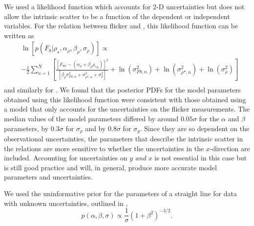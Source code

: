 We used a likelihood function which accounts for 2-D uncertainties but does
not allow the intrinsic scatter to be a function of the dependent or
independent variables.
For the relation between flicker and \rhostar, this likelihood function can be
written as
\begin{eqnarray}
	& \ln\left[p(F_8|\rho_\star, \alpha_\rho, \beta_\rho, \sigma_{\rho})\right]
        \propto  \\ \nonumber
    & -\frac{1}{2}\sum_{n=1}^N \left[\frac{[F_{8n}-(\alpha_\rho
    + \beta_\rho \rho_{*n})]^2}
	{\left[\beta_\rho \sigma_{F8, n}^2 + \sigma_{\rho *, n}^2 +
    \sigma_{\rho}^2\right]} + \ln(\sigma_{F8, n}^2) + \ln(\sigma_{\rho*, n}^2)
    + \ln(\sigma_\rho^2) \right]
	\\ \nonumber
\end{eqnarray}
\label{eq:likelihood}
and similarly for \logg.
We found that the posterior PDFs for the model parameters obtained using this
likelihood function were consistent with those obtained using a model that
only accounts for the uncertainties on the flicker measurements.
The median values of the model parameters differed by around $0.05
\sigma$ for the $\alpha$ and $\beta$ parameters, by $0.3 \sigma$ for
$\sigma_\rho$ and by $0.8 \sigma$ for $\sigma_g$.
Since they are so dependent on the observational uncertainties, the parameters
that describe the intrinsic scatter in the relations are more sensitive to
whether the uncertainties in the $x$-direction are included.
Accounting for uncertainties on $y$ {\it and} $x$ is not essential in this
case but is still good practice and will, in general, produce more accurate
model parameters and uncertainties.

We used the uninformative prior for the parameters of a straight line for
data with unknown uncertainties, outlined in \citet{Vanderplas2014},
\begin{equation}
p(\alpha, \beta, \sigma) \propto \frac{1}{\sigma} \left( 1 + \beta^2
\right)^{-3/2}.
\end{equation}
\label{eq:priors}


